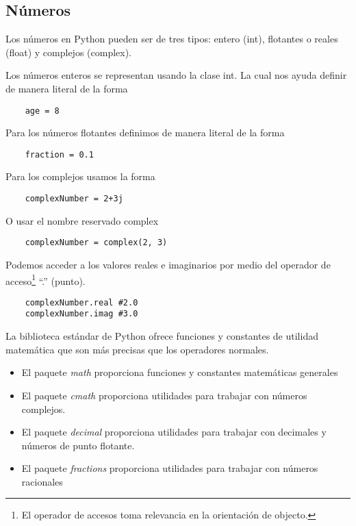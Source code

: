 \documentclass[12pt]{article}
\begin{document}
    \subsection{Números}
    Los números en Python pueden ser de tres tipos: entero (int), flotantes o reales (float) y complejos (complex).

    Los números enteros se representan usando la clase int.
    La cual nos ayuda definir de manera literal de la forma
    \begin{lstlisting}
    age = 8
    \end{lstlisting}

    Para los números flotantes definimos de manera literal de la forma
    \begin{lstlisting}
    fraction = 0.1
    \end{lstlisting}

    Para los complejos usamos la forma
    \begin{lstlisting}
    complexNumber = 2+3j
    \end{lstlisting}

    O usar el nombre reservado complex
    \begin{lstlisting}
    complexNumber = complex(2, 3)
    \end{lstlisting}
    Podemos acceder a los valores reales e imaginarios por medio del operador de acceso\footnote{El operador de accesos toma relevancia en la orientación de objecto.} ``.'' (punto).
    \begin{lstlisting}
    complexNumber.real #2.0
    complexNumber.imag #3.0
    \end{lstlisting}

    La biblioteca estándar de Python ofrece funciones y constantes de utilidad matemática que son más precisas que los operadores normales.
    \begin{itemize}
        \item El paquete \textit{math} proporciona funciones y constantes matemáticas generales
        \item El paquete \textit{cmath} proporciona utilidades para trabajar con números complejos.
        \item El paquete \textit{decimal} proporciona utilidades para trabajar con decimales y números de punto flotante.
        \item El paquete \textit{fractions} proporciona utilidades para trabajar con números racionales
    \end{itemize}
\end{document}
